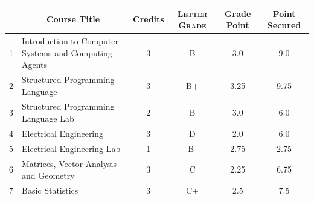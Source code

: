 \documentclass[11pt]{article}
\newcommand*{\numtwo}[1]{\pgfmathprintnumber[
                    fixed, precision=2, fixed zerofill=true]{#1}}
\begin{document}
                \begin{center}
                    \renewcommand{\arraystretch}{1.08}
                    
                \begin{tabular}{|c|l|c|>{\scshape}c|c|c|}
                \hline  \rule[-1ex]{0pt}{3.5ex} {\centering{\bf Course Code}} &  \multicolumn{1}{c|}{\textbf{Course Title}}  & {\bf Credits} & {\bf Letter Grade} & {\bf Grade Point} & {\bf Point Secured}  \\ 
                \hline   1 &  Introduction to Computer Systems and Computing Agents		 & 3 & B & 3.0 & 9.0 \\ %
                \hline   2 &  Structured Programming Language		 & 3 & B+ & 3.25 & 9.75 \\ %
                \hline   3 &  Structured Programming Language Lab		 & 2 & B & 3.0 & 6.0 \\ %
                \hline   4 &  Electrical Engineering		 & 3 & D & 2.0 & 6.0 \\ %
                \hline   5 &  Electrical Engineering Lab		 & 1 & B- & 2.75 & 2.75 \\ %
                \hline   6 &  Matrices, Vector Analysis and Geometry		 & 3 & C & 2.25 & 6.75 \\ %
                \hline   7 &  Basic Statistics		 & 3 & C+ & 2.5 & 7.5 \\ %

\hline                %
                \end{tabular}
                \end{center}
                \renewcommand{\arraystretch}{1.03}
\end{document}
